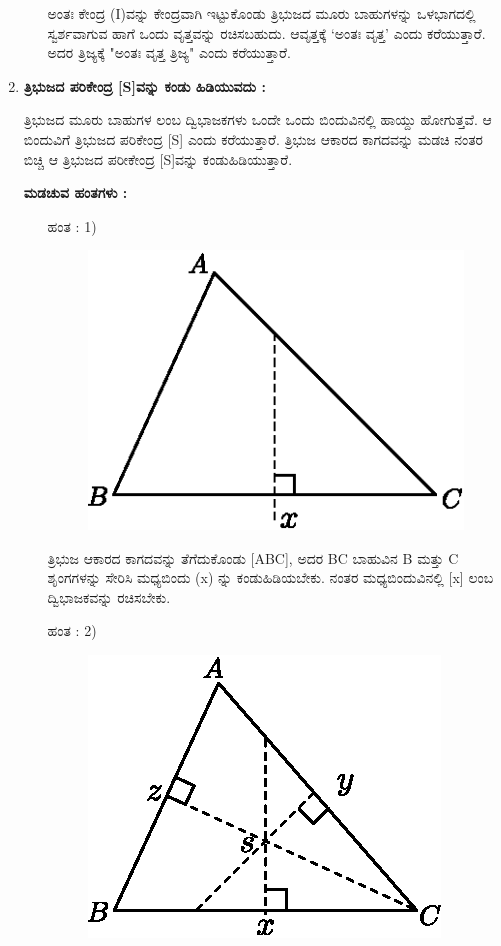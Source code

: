 \begin{enumerate}
\begin{itemize}
 ಅಂತಃ ಕೇಂದ್ರ (I)ವನ್ನು ಕೇಂದ್ರವಾಗಿ ಇಟ್ಟುಕೊಂಡು ತ್ರಿಭುಜದ ಮೂರು ಬಾಹುಗಳನ್ನು ಒಳಭಾಗದಲ್ಲಿ ಸ್ವರ್ಶವಾಗುವ ಹಾಗೆ ಒಂದು ವೃತ್ತವನ್ನು ರಚಿಸಬಹುದು. ಆವೃತ್ತಕ್ಕೆ  `ಅಂತಃ ವೃತ್ತ' ಎಂದು ಕರೆಯುತ್ತಾರೆ. ಅದರ ತ್ರಿಜ್ಯಕ್ಕೆ "ಅಂತಃ ವೃತ್ತ ತ್ರಿಜ್ಯ" ಎಂದು ಕರೆಯುತ್ತಾರೆ. 
  \end{itemize}
  
  \item \textbf{ತ್ರಿಭುಜದ ಪರಿಕೇಂದ್ರ [S]ವನ್ನು ಕಂಡು ಹಿಡಿಯುವದು :}
  
  ತ್ರಿಭುಜದ ಮೂರು ಬಾಹುಗಳ ಲಂಬ ದ್ವಿಭಾಜಕಗಳು ಒಂದೇ ಒಂದು ಬಿಂದುವಿನಲ್ಲಿ ಹಾಯ್ದು ಹೋಗುತ್ತವೆ. ಆ ಬಿಂದುವಿಗೆ ತ್ರಿಭುಜದ ಪರಿಕೇಂದ್ರ [S] ಎಂದು ಕರೆಯುತ್ತಾರೆ. ತ್ರಿಭುಜ ಆಕಾರದ ಕಾಗದವನ್ನು ಮಡಚಿ ನಂತರ ಬಿಚ್ಚಿ ಆ ತ್ರಿಭುಜದ ಪರೀಕೇಂದ್ರ [S]ವನ್ನು ಕಂಡುಹಿಡಿಯುತ್ತಾರೆ. 
  
    \noindent
 \textbf{ಮಡಚುವ ಹಂತಗಳು :}
  \begin{itemize}
 \item[ಹಂತ : 1)] 
 ~
 \begin{figure}[H]
\centering
\includegraphics[scale=.9]{src/figure/chap1/fig1-38a.eps}
\end{figure}
  
 
 ತ್ರಿಭುಜ ಆಕಾರದ ಕಾಗದವನ್ನು ತೆಗೆದುಕೊಂಡು [ABC], ಅದರ  BC ಬಾಹುವಿನ  B ಮತ್ತು C ಶೃಂಗಗಳನ್ನು ಸೇರಿಸಿ ಮಧ್ಯಬಿಂದು  (x) ನ್ನು ಕಂಡುಹಿಡಿಯಬೇಕು. ನಂತರ ಮಧ್ಯಬಿಂದುವಿನಲ್ಲಿ [x] ಲಂಬ ದ್ವಿಭಾಜಕವನ್ನು ರಚಿಸಬೇಕು.
 
 
 \item[ಹಂತ : 2)] 
 ~
 \begin{figure}[H]
\centering
\includegraphics[scale=.9]{src/figure/chap1/fig1-38b.eps}
\end{figure}
 

\end{itemize}
\end{enumerate}
